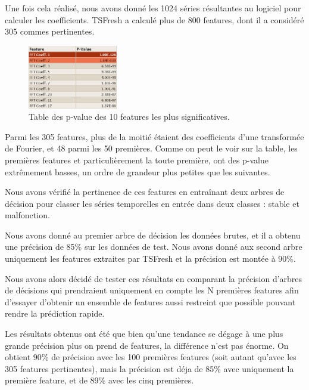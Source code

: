 \documentclass[french]{article}
\theoremstyle{mytheoremstyle}
\theoremstyle{mytheoremstyle}
\theoremstyle{myproblemstyle}
\begin{document}
        Une fois cela réalisé, nous avons donné les 1024 séries résultantes au logiciel pour calculer les coefficients. TSFresh a calculé plus de 800 features, dont il a considéré 305 commes pertinentes.
        
\begin{figure}[H]
            \centering
            \includegraphics[width=0.35\textwidth]{images/features_pvalue.png}
            \caption{Table des p-value des 10 features les plus significatives.}
            \label{}
        \end{figure}

        Parmi les 305 features, plus de la moitié étaient des coefficients d'une transformée de Fourier, et 48 parmi les 50 premières. Comme on peut le voir sur la table, les premières features et particulièrement la toute première, ont des p-value extrêmement basses, un ordre de grandeur plus petites que les suivantes.
        
        Nous avons vérifié la pertinence de ces features en entraînant deux arbres de décision pour classer les séries temporelles en entrée dans deux classes : stable et malfonction.
        
        Nous avons donné au premier arbre de décision les données brutes, et il a obtenu une précision de 85\% sur les données de test. Nous avons donné aux second arbre uniquement les features extraites par TSFresh et la précision est montée à 90\%.
        
        Nous avons alors décidé de tester ces résultats en comparant la précision d'arbres de décisions qui prendraient uniquement en compte les N premières features afin d'essayer d'obtenir un ensemble de features aussi restreint que possible pouvant rendre la prédiction rapide. 
        
        Les résultats obtenus ont été que bien qu'une tendance se dégage à une plus grande précision plus on prend de features, la différence n'est pas énorme. On obtient 90\% de précision avec les 100 premières features (soit autant qu'avec les 305 features pertinentes), mais la précision est déja de 85\% avec uniquement la première feature, et de  89\% avec les cinq premières.
        
\end{document}
